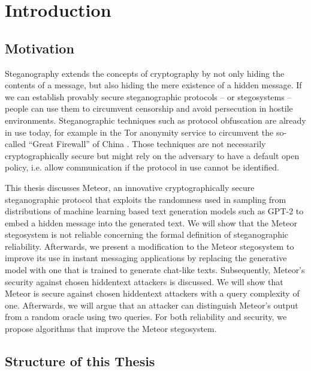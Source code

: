 \chapter{Introduction}

\section{Motivation}


Steganography extends the concepts of cryptography by not only hiding the contents of a message, but also hiding the mere existence of a hidden message.
If we can establish provably secure steganographic protocols -- or stegosystems -- people can use them to circumvent censorship and avoid persecution in hostile environments.
Steganographic techniques such as protocol obfuscation are already in use today, for example in the Tor anonymity service to circumvent the so-called ``Great Firewall'' of China \cite{TorBlocking2012}.
Those techniques are not necessarily cryptographically secure but might rely on the adversary to have a default open policy, i.e. allow communication if the protocol in use cannot be identified.

This thesis discusses Meteor, an innovative cryptographically secure steganographic protocol that exploits the randomness used in sampling from distributions of machine learning based text generation models such as GPT-2 to embed a hidden message into the generated text.
We will show that the Meteor stegosystem is not reliable concerning the formal definition of steganographic reliability.
Afterwards, we present a modification to the Meteor stegosystem to improve its use in instant messaging applications by replacing the generative model with one that is trained to generate chat-like texts.
Subsequently, Meteor's security against chosen hiddentext attackers is discussed.
We will show that Meteor is secure against chosen hiddentext attackers with a query complexity of one.
Afterwards, we will argue that an attacker can distinguish Meteor's output from a random oracle using two queries.
For both reliability and security, we propose algorithms that improve the Meteor stegosystem.


\section{Structure of this Thesis}

